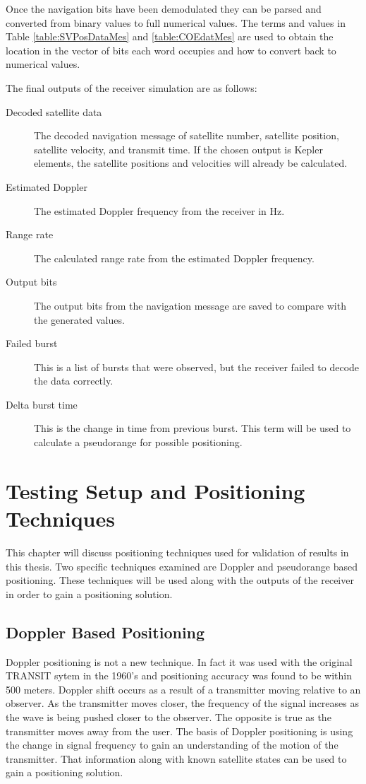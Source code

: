 \documentclass[12pt]{report}
\begin{document}
Once the navigation bits have been demodulated they can be parsed and converted from binary values to full numerical values. The terms and values in Table \ref{table:SVPosDataMes} and \ref{table:COEdatMes} are used to obtain the location in the vector of bits each word occupies and how to convert back to numerical values. 

The final outputs of the receiver simulation are as follows:
\begin{description}
    \item[Decoded satellite data] The decoded navigation message of satellite number, satellite position, satellite velocity, and transmit time. If the chosen output is Kepler elements, the satellite positions and velocities will already be calculated.
    \item[Estimated Doppler] The estimated Doppler frequency from the receiver in Hz.
    \item[Range rate] The calculated range rate from the estimated Doppler frequency. 
    \item[Output bits] The output bits from the navigation message are saved to compare with the generated values.
    \item[Failed burst] This is a list of bursts that were observed, but the receiver failed to decode the data correctly.
    \item[Delta burst time] This is the change in time from previous burst. This term will be used to calculate a pseudorange for possible positioning. 
\end{description}

\chapter{Testing Setup and Positioning Techniques}
This chapter will discuss positioning techniques used for validation of results in this thesis. Two specific techniques examined are Doppler  and pseudorange based positioning. These techniques will be used along with the outputs of the receiver in order to gain a positioning solution.
 
\section{Doppler Based Positioning} \label{sec:DopplerPosTechnique}
Doppler positioning is not a new technique. In fact it was used with the original TRANSIT sytem in the 1960's and positioning accuracy was found to be within 500 meters. Doppler shift occurs as a result of a transmitter moving relative to an observer. As the transmitter moves closer, the frequency of the signal increases as the wave is being pushed closer to the observer. The opposite is true as the transmitter moves away from the user. The basis of Doppler positioning is using the change in signal frequency to gain an understanding of the motion of the transmitter. That information along with known satellite states can be used to gain a positioning solution.
\end{document}
